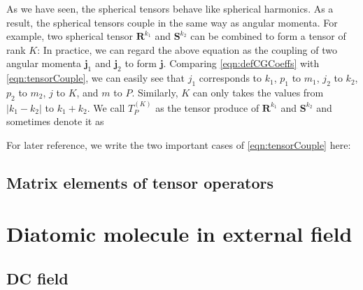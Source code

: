 As we have seen, the spherical tensors behave like spherical harmonics. As a result, the spherical tensors  
couple in the same way as angular momenta. For example, two spherical tensor $\mathbf{R}^{k_1}$ and  
$\mathbf{S}^{k_2}$ can be combined to form a tensor of rank $K$:
In practice, we can regard the above equation as the coupling of two angular momenta $\mathbf{j}_1$ and 
$\mathbf{j}_2$ to form $\mathbf{j}$. Comparing \autoref{eqn:defCGCoeffs} with \autoref{eqn:tensorCouple}, we can easily see that $j_1$ corresponds to $k_1$, $p_1$ to $m_1$, $j_2$ to $k_2$, $p_2$ to $m_2$,
$j$ to $K$, and $m$ to $P$. Similarly, $K$ can only takes the values from $|k_1 - k_2|$ to $k_1 + k_2$. We call 
$T_{P}^{(K)}$ as the tensor produce of $\mathbf{R}^{k_1}$ and  $\mathbf{S}^{k_2}$ and sometimes denote it as

For later reference, we write the two important cases of \autoref{eqn:tensorCouple} here:

\subsection{Matrix elements of tensor operators} 



\section{Diatomic molecule in external field}
\label{sec:moleculeInField}

\subsection{DC field}
\label{sec:dcField}

